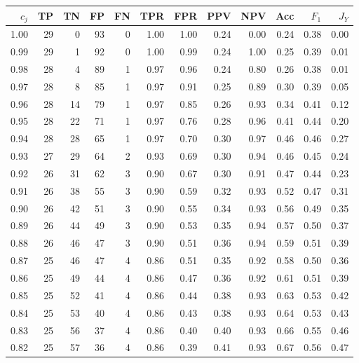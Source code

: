 \clearpage
\begin{table}[ht]
\centering
{}
\captionsetup{font=scriptsize}
\begingroup\tiny
\begin{tabular}{r|rrrrrrrrrrr}
  $c_j$ & TP & TN & FP & FN & TPR & FPR & PPV & NPV & Acc & $F_1$ & $J_Y$ \\ 
  \hline
  1.00 & 29 & 0 & 93 & 0 & 1.00 & 1.00 & 0.24 & 0.00 & 0.24 & 0.38 & 0.00 \\ 
  0.99 & 29 & 1 & 92 & 0 & 1.00 & 0.99 & 0.24 & 1.00 & 0.25 & 0.39 & 0.01 \\ 
  0.98 & 28 & 4 & 89 & 1 & 0.97 & 0.96 & 0.24 & 0.80 & 0.26 & 0.38 & 0.01 \\ 
  0.97 & 28 & 8 & 85 & 1 & 0.97 & 0.91 & 0.25 & 0.89 & 0.30 & 0.39 & 0.05 \\ 
  0.96 & 28 & 14 & 79 & 1 & 0.97 & 0.85 & 0.26 & 0.93 & 0.34 & 0.41 & 0.12 \\ 
  0.95 & 28 & 22 & 71 & 1 & 0.97 & 0.76 & 0.28 & 0.96 & 0.41 & 0.44 & 0.20 \\ 
  0.94 & 28 & 28 & 65 & 1 & 0.97 & 0.70 & 0.30 & 0.97 & 0.46 & 0.46 & 0.27 \\ 
  0.93 & 27 & 29 & 64 & 2 & 0.93 & 0.69 & 0.30 & 0.94 & 0.46 & 0.45 & 0.24 \\ 
  0.92 & 26 & 31 & 62 & 3 & 0.90 & 0.67 & 0.30 & 0.91 & 0.47 & 0.44 & 0.23 \\ 
  0.91 & 26 & 38 & 55 & 3 & 0.90 & 0.59 & 0.32 & 0.93 & 0.52 & 0.47 & 0.31 \\ 
  0.90 & 26 & 42 & 51 & 3 & 0.90 & 0.55 & 0.34 & 0.93 & 0.56 & 0.49 & 0.35 \\ 
  0.89 & 26 & 44 & 49 & 3 & 0.90 & 0.53 & 0.35 & 0.94 & 0.57 & 0.50 & 0.37 \\ 
  0.88 & 26 & 46 & 47 & 3 & 0.90 & 0.51 & 0.36 & 0.94 & 0.59 & 0.51 & 0.39 \\ 
  0.87 & 25 & 46 & 47 & 4 & 0.86 & 0.51 & 0.35 & 0.92 & 0.58 & 0.50 & 0.36 \\ 
  0.86 & 25 & 49 & 44 & 4 & 0.86 & 0.47 & 0.36 & 0.92 & 0.61 & 0.51 & 0.39 \\ 
  0.85 & 25 & 52 & 41 & 4 & 0.86 & 0.44 & 0.38 & 0.93 & 0.63 & 0.53 & 0.42 \\ 
  0.84 & 25 & 53 & 40 & 4 & 0.86 & 0.43 & 0.38 & 0.93 & 0.64 & 0.53 & 0.43 \\ 
  0.83 & 25 & 56 & 37 & 4 & 0.86 & 0.40 & 0.40 & 0.93 & 0.66 & 0.55 & 0.46 \\ 
  0.82 & 25 & 57 & 36 & 4 & 0.86 & 0.39 & 0.41 & 0.93 & 0.67 & 0.56 & 0.47 \\ 

\end{tabular}
\end{table}
